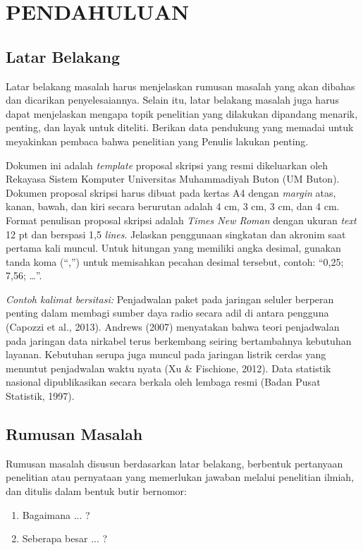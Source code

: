 \chapter{PENDAHULUAN}

\section{Latar Belakang}
Latar belakang masalah harus menjelaskan rumusan masalah yang akan dibahas dan dicarikan penyelesaiannya. Selain itu, latar belakang masalah juga harus dapat menjelaskan mengapa topik penelitian yang dilakukan dipandang menarik, penting, dan layak untuk diteliti. Berikan data pendukung yang memadai untuk meyakinkan pembaca bahwa penelitian yang Penulis lakukan penting.

Dokumen ini adalah \textit{template} proposal skripsi yang resmi dikeluarkan oleh Rekayasa Sistem Komputer Universitas Muhammadiyah Buton (UM Buton). Dokumen proposal skripsi harus dibuat pada kertas A4 dengan \textit{margin} atas, kanan, bawah, dan kiri secara berurutan adalah 4 cm, 3 cm, 3 cm, dan 4 cm. Format penulisan proposal skripsi adalah \textit{Times New Roman} dengan ukuran \textit{text} 12 pt dan berspasi 1,5 \textit{lines}. Jelaskan penggunaan singkatan dan akronim saat pertama kali muncul. Untuk hitungan yang memiliki angka desimal, gunakan tanda koma (“,”) untuk memisahkan pecahan desimal tersebut, contoh: “0,25; 7,56; …”.

\textit{Contoh kalimat bersitasi:} Penjadwalan paket pada jaringan seluler berperan penting dalam membagi sumber daya radio secara adil di antara pengguna (Capozzi et al., 2013). Andrews (2007) menyatakan bahwa teori penjadwalan pada jaringan data nirkabel terus berkembang seiring bertambahnya kebutuhan layanan. Kebutuhan serupa juga muncul pada jaringan listrik cerdas yang menuntut penjadwalan waktu nyata (Xu \& Fischione, 2012). Data statistik nasional dipublikasikan secara berkala oleh lembaga resmi (Badan Pusat Statistik, 1997).

\section{Rumusan Masalah}
Rumusan masalah disusun berdasarkan latar belakang, berbentuk pertanyaan penelitian atau pernyataan yang memerlukan jawaban melalui penelitian ilmiah, dan ditulis dalam bentuk butir bernomor:
\begin{enumerate}
\item Bagaimana ... ?
\item Seberapa besar ... ?
\end{enumerate}


